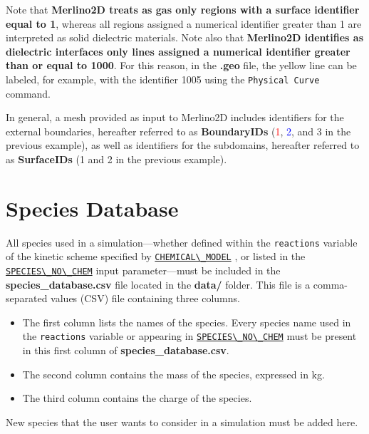 \documentclass[12pt,a4paper]{article}
\newcommand{\matlabs}[1]{{\lstinline[style=MatlabStyle]!#1!}}
\newcommand{\seclink}[2]{%
	\begingroup
	\hypersetup{linkcolor=orange}%
	\hyperref[sec:#1]{\matlabs{#2}}%
	\endgroup
}
\begin{document}
	Note that \textbf{Merlino2D treats as gas only regions with a surface identifier equal to 1}, whereas all regions assigned a numerical identifier greater than 1 are interpreted as solid dielectric materials.
	Note also that \textbf{Merlino2D identifies as dielectric interfaces only lines assigned a numerical identifier greater than or equal to 1000}. 
	For this reason, in the \textbf{.geo} file, the yellow line can be labeled, for example, with the identifier 1005 using the \matlabs{Physical Curve} command.
	
	In general, a mesh provided as input to Merlino2D includes identifiers for the external boundaries, hereafter referred to as \textbf{BoundaryIDs} (\textcolor{red}{1}, \textcolor{blue}{2}, and \textcolor{mygreen}{3} in the previous example), as well as identifiers for the subdomains, hereafter referred to as \textbf{SurfaceIDs} (\colorbox{aircolor}{1} and \colorbox{dielcolor}{2} in the previous example).
	
	\section{Species Database}
	All species used in a simulation—whether defined within the \matlabs{reactions} variable of the kinetic scheme specified by \seclink{chemicalmodel}{CHEMICAL\_MODEL}, or listed in the \seclink{speciesnochem}{SPECIES\_NO\_CHEM} input parameter—must be included in the \textbf{species\_database.csv} file located in the \textbf{data/} folder.
	This file is a comma-separated values (CSV) file containing three columns. 
	\begin{itemize}
	\item The first column lists the names of the species. Every species name used in the \matlabs{reactions} variable or appearing in \seclink{speciesnochem}{SPECIES\_NO\_CHEM} must be present in this first column of \textbf{species\_database.csv}. 
	
	\item The second column contains the mass of the species, expressed in \unit{\kilogram}. 
	
	\item The third column contains the charge of the species. 
	\end{itemize}
	
	
	New species that the user wants to consider in a simulation must be added here.
	
\end{document}
